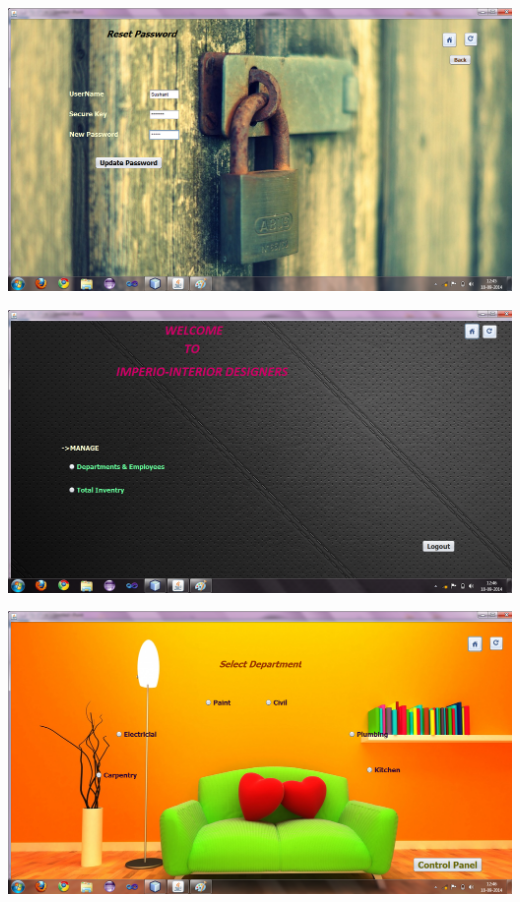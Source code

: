 \documentclass[12pt,a4paper]{report}
\begin{document}
\begin{center}
\includegraphics[scale=0.45]{11.png}
\end{center}
\begin{center}
\includegraphics[scale=0.45]{12.png}
\end{center}
\begin{center}
\includegraphics[scale=0.45]{13.png}
\end{center}
\end{document}
